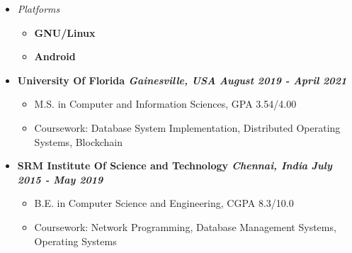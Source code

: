 \documentclass[9]{Resume}
\begin{document}
\begin{minipage}[t]{0.45\textwidth}
\begin{itemize}[noitemsep,nolistsep,leftmargin=*]
	\item[]\textit{Platforms}
			\vspace{-1em}
			\begin{multicols}{2}
			\begin{itemize}[leftmargin=*]
			\setlength\itemsep{-0.25em}
			\item[]\textbf{GNU/Linux}\hspace{5pt}
			\item[]\textbf{Android}\hspace{5pt}
			\end{itemize}
			\end{multicols}
	\end{itemize}
		
\end{minipage}


\begin{itemize}[noitemsep,nolistsep]
	\item[]\textbf{University Of Florida \textit{{\scriptsize Gainesville, USA}} \hfill \textit{August 2019 - April 2021}}
		\begin{itemize}[leftmargin=*]
			\setlength\itemsep{-0.25em}
			\item[\textbullet]M.S. in Computer and Information Sciences, GPA 3.54/4.00
			\item[\textbullet]{\small Coursework: Database System Implementation, Distributed Operating Systems, Blockchain}
		\end{itemize}
	\item[]\textbf{SRM Institute Of Science and Technology \textit{{\scriptsize Chennai, India}} \hfill \textit{July 2015 - May 2019}}
		\begin{itemize}[leftmargin=*]
			\setlength\itemsep{-0.25em}
			\item[\textbullet]B.E. in Computer Science and Engineering, CGPA 8.3/10.0
			\item[\textbullet]{\small Coursework: Network Programming, Database Management Systems, Operating Systems}
		\end{itemize}
\end{itemize}
\end{document}
